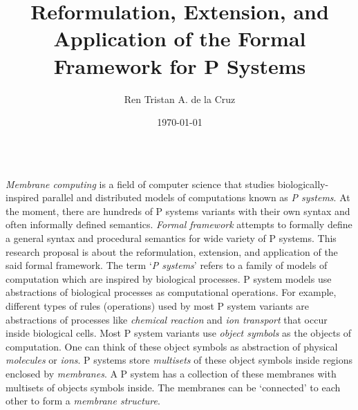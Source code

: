 \documentclass[25pt, a0paper, portrait]{tikzposter}
\title{Reformulation, Extension, and Application
\newline of the Formal Framework for P Systems}
\author{Ren Tristan A. de la Cruz}
\date{\today}
\institute{University of the Philippines - Diliman}
\begin{document}
 
\maketitle

\begin{columns}
{
\emph{Membrane computing} is a field of computer science that studies biologically-inspired          
parallel and distributed models of computations known as \emph{P systems}. At the moment, there      
are hundreds of P systems variants with their own syntax and often informally defined semantics.     
\emph{Formal framework} attempts to formally define a general syntax and procedural semantics for    
wide variety of P systems. This research proposal is about the reformulation, extension, and         
application of the said formal framework. 
}
{
The term `\textit{P systems}' refers to a family of           
models of computation which are inspired by biological processes. P system models use abstractions        
of biological processes as computational operations. For example, different types of rules                
(operations) used by most P system variants are abstractions of processes like \textit{chemical           
reaction} and \textit{ion transport} that occur inside biological cells. Most P system variants use       
\textit{object symbols} as the objects of computation. One can think of these object symbols as           
abstraction of physical \textit{molecules} or \textit{ions}. P systems store \textit{multisets} of        
these object symbols inside regions enclosed by \textit{membranes}. A P system has a collection of        
these membranes with multisets of objects symbols inside. The membranes can be `connected' to each        
other to form a \textit{membrane structure}.                                                              
}
\end{columns}
\end{document}

